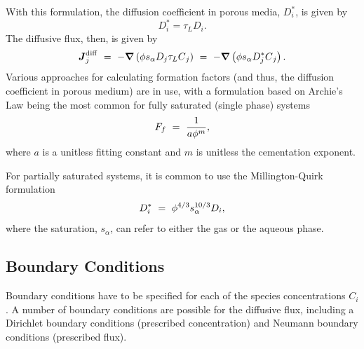 With this formulation, the diffusion coefficient in porous media, $D_{i}^{*}$, is given by
\begin{equation} \label{eq:EffectiveDiffusion)} 
  D_{i}^{*} =\tau_{L} D_{i}.  
\end{equation} 
The diffusive flux, then, is given by
\begin{equation} \label{eq:DiffusiveFluxPorousMedia)} 
  \boldsymbol{J}_{j}^{\rm diff} 
  \ =\  
  -\boldsymbol{\nabla} \left( \phi s_{\alpha} D_{j} \tau_{L} C{}_{j} \right) 
  \ =\  
  -\boldsymbol{\nabla} \left( \phi s_{\alpha} D_{j}^{*} C{}_{j} \right) .  
\end{equation} 
Various approaches for calculating formation factors (and thus, the diffusion coefficient in porous medium) are in use, 
with a formulation based on Archie's Law being the most common for fully saturated (single phase) systems
\begin{equation} \label{eq:CementationExponent} 
  F_f  \ =\  \frac{1}{a\phi ^{m} } ,  
\end{equation} 
where $a$ is a unitless fitting constant and $m$ is unitless the cementation exponent.  

For partially saturated systems, it is common to use the Millington-Quirk formulation 
\citep{millington1961permeability, sumner-handbook, moldrup2000predicting}
\begin{equation}   \label{eq:MillingtonQuirk}
  D_{i}^{*} \ =\  \phi^{4/3} s_{\alpha}^{10/3}  D_{i},
\end{equation}
where the saturation, $s_{\alpha}$, can refer to either the gas or the aqueous phase.




\subsection{Boundary Conditions} 
\label{sec:transport-boundary-conditions}

\noindent 
Boundary conditions have to be specified for each of the species concentrations $C_i$.
A number of boundary conditions are possible for the diffusive flux, 
including a Dirichlet boundary conditions (prescribed concentration) 
and Neumann boundary conditions (prescribed flux). 

